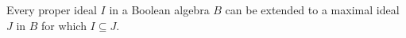 Every proper ideal $I$ in a Boolean algebra $B$ can be extended to a maximal ideal $J$ in $B$ for which $I \subseteq J$.
